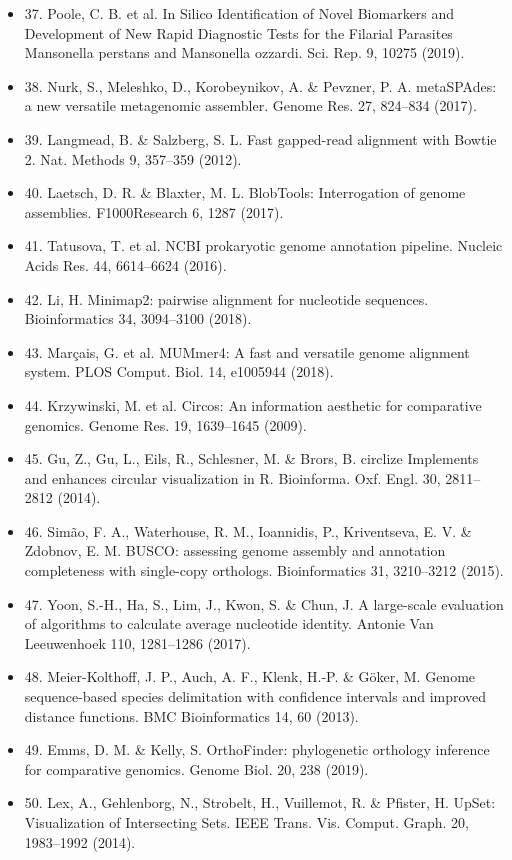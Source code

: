 \documentclass[10pt, a4paper, twocolumn]{article} %
\begin{document}
\begin{itemize}
\item 37.	Poole, C. B. et al. In Silico Identification of Novel Biomarkers and Development of New Rapid Diagnostic Tests for the Filarial Parasites Mansonella perstans and Mansonella ozzardi. Sci. Rep. 9, 10275 (2019).
\item 38.	Nurk, S., Meleshko, D., Korobeynikov, A. \& Pevzner, P. A. metaSPAdes: a new versatile metagenomic assembler. Genome Res. 27, 824–834 (2017).
\item 39.	Langmead, B. \& Salzberg, S. L. Fast gapped-read alignment with Bowtie 2. Nat. Methods 9, 357–359 (2012).
\item 40.	Laetsch, D. R. \& Blaxter, M. L. BlobTools: Interrogation of genome assemblies. F1000Research 6, 1287 (2017).
\item 41.	Tatusova, T. et al. NCBI prokaryotic genome annotation pipeline. Nucleic Acids Res. 44, 6614–6624 (2016).
\item 42.	Li, H. Minimap2: pairwise alignment for nucleotide sequences. Bioinformatics 34, 3094–3100 (2018).
\item 43.	Marçais, G. et al. MUMmer4: A fast and versatile genome alignment system. PLOS Comput. Biol. 14, e1005944 (2018).
\item 44.	Krzywinski, M. et al. Circos: An information aesthetic for comparative genomics. Genome Res. 19, 1639–1645 (2009).
\item 45.	Gu, Z., Gu, L., Eils, R., Schlesner, M. \& Brors, B. circlize Implements and enhances circular visualization in R. Bioinforma. Oxf. Engl. 30, 2811–2812 (2014).
\item 46.	Simão, F. A., Waterhouse, R. M., Ioannidis, P., Kriventseva, E. V. \& Zdobnov, E. M. BUSCO: assessing genome assembly and annotation completeness with single-copy orthologs. Bioinformatics 31, 3210–3212 (2015).
\item 47.	Yoon, S.-H., Ha, S., Lim, J., Kwon, S. \& Chun, J. A large-scale evaluation of algorithms to calculate average nucleotide identity. Antonie Van Leeuwenhoek 110, 1281–1286 (2017).
\item 48.	Meier-Kolthoff, J. P., Auch, A. F., Klenk, H.-P. \& Göker, M. Genome sequence-based species delimitation with confidence intervals and improved distance functions. BMC Bioinformatics 14, 60 (2013).
\item 49.	Emms, D. M. \& Kelly, S. OrthoFinder: phylogenetic orthology inference for comparative genomics. Genome Biol. 20, 238 (2019).
\item 50.	Lex, A., Gehlenborg, N., Strobelt, H., Vuillemot, R. \& Pfister, H. UpSet: Visualization of Intersecting Sets. IEEE Trans. Vis. Comput. Graph. 20, 1983–1992 (2014).

\end{itemize}
\end{document}
